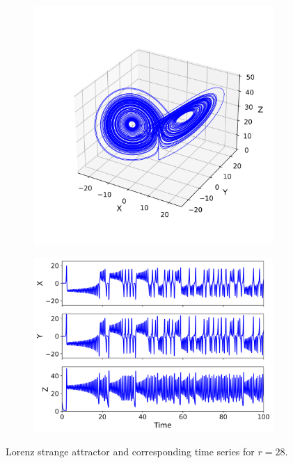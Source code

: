 \documentclass[paper=a4, fontsize=11pt]{scrartcl}
\numberwithin{equation}{section}		%
\numberwithin{figure}{section}			%
\numberwithin{table}{section}				%
\begin{document}
\begin{figure}
\begin{subfigure}[b]{0.485\textwidth}
		\centering
		\includegraphics[width=\textwidth]{media/attractor_28.00.png}
		\caption{}
		\label{fig:sub1}
	\end{subfigure}
	\hfill
	\begin{subfigure}[b]{0.505\textwidth}
		\centering
		\includegraphics[width=\textwidth]{media/time_series_28.00.png}
		\caption{}
		\label{fig:sub2}
	\end{subfigure}
	
	\caption{Lorenz strange attractor and corresponding time series for \( r = 28 \).}
	\label{fig:chaos}
\end{figure}
\end{document}
